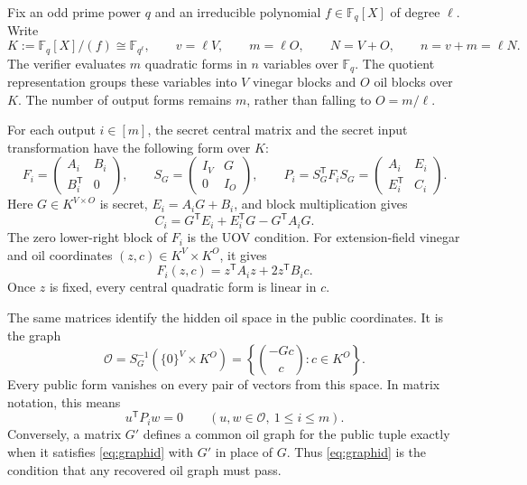 \documentclass[11pt,a4paper]{article}
\theoremstyle{definition}
\theoremstyle{remark}
\newcommand{\F}{\mathbb F}
\newcommand{\cO}{\mathcal O}
\newcommand{\trans}{\mathsf T}
\begin{document}
Fix an odd prime power $q$ and an irreducible polynomial $f\in\F_q[X]$ of
degree $\ell$.  Write
\begin{equation}\label{eq:parameter-stack}
 K:=\F_q[X]/(f)\cong\F_{q^\ell},\qquad
 v=\ell V,\qquad m=\ell O,\qquad
 N=V+O,\qquad n=v+m=\ell N.
\end{equation}
The verifier evaluates $m$ quadratic forms in $n$ variables over $\F_q$.
The quotient representation groups these variables into $V$ vinegar blocks
and $O$ oil blocks over $K$.  The number of output forms remains $m$, rather
than falling to $O=m/\ell$.

For each output $i\in[m]$, the secret central matrix and the secret input
transformation have the following form over $K$:
\begin{equation}\label{eq:central}
 F_i=\begin{pmatrix}A_i&B_i\\B_i^{\trans}&0\end{pmatrix},
 \qquad
 S_G=\begin{pmatrix}I_V&G\\0&I_O\end{pmatrix},
 \qquad
 P_i=S_G^{\trans}F_iS_G
     =\begin{pmatrix}A_i&E_i\\E_i^{\trans}&C_i\end{pmatrix}.
\end{equation}
Here $G\in K^{V\times O}$ is secret,
$E_i=A_iG+B_i$, and block multiplication gives
\begin{equation}\label{eq:graphid}
 C_i=G^{\trans}E_i+E_i^{\trans}G-G^{\trans}A_iG.
\end{equation}
The zero lower-right block of $F_i$ is the UOV condition.  For extension-field
vinegar and oil coordinates $(z,c)\in K^V\times K^O$, it gives
\begin{equation}\label{eq:central-evaluation}
 F_i(z,c)=z^{\trans}A_iz+2z^{\trans}B_ic.
\end{equation}
Once $z$ is fixed, every central quadratic form is linear in $c$.

The same matrices identify the hidden oil space in the public coordinates.
It is the graph
\begin{equation}\label{eq:graph}
 \cO=S_G^{-1}(\{0\}^V\times K^O)
     =\left\{\binom{-Gc}{c}:c\in K^O\right\}.
\end{equation}
Every public form vanishes on every pair of vectors from this space.  In
matrix notation, this means
\begin{equation}\label{eq:isotropy}
 u^{\trans}P_iw=0
 \qquad(u,w\in\cO,\ 1\le i\le m).
\end{equation}
Conversely, a matrix $G'$ defines a common oil graph for the public tuple
exactly when it satisfies \eqref{eq:graphid} with $G'$ in place of $G$.
Thus \eqref{eq:graphid} is the condition that any recovered oil graph must
pass.
\end{document}
